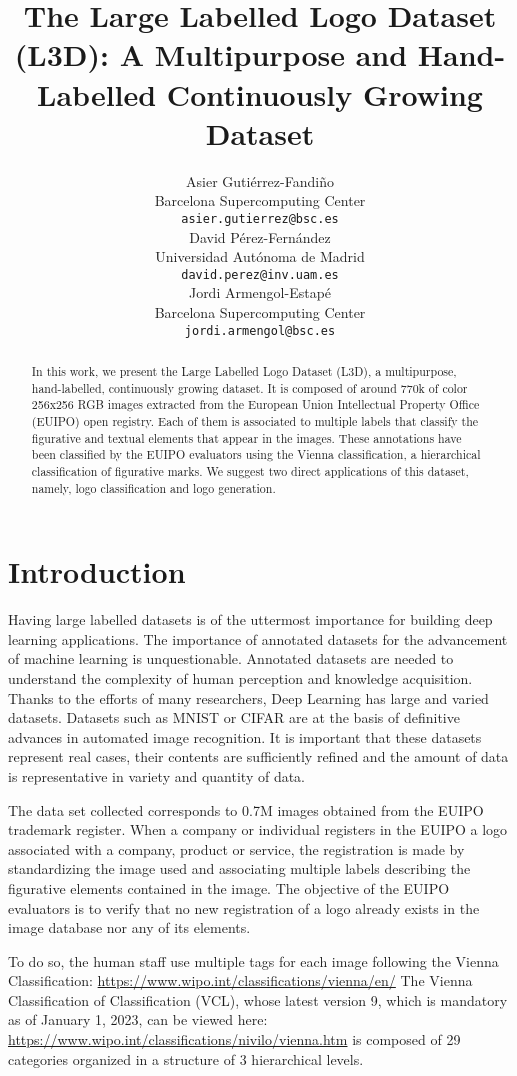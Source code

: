 \documentclass{article}
\title{The Large Labelled Logo Dataset (L3D): A Multipurpose and Hand-Labelled Continuously Growing Dataset}
\author{
 Asier Gutiérrez-Fandiño\\
  Barcelona Supercomputing Center\\
  \texttt{asier.gutierrez@bsc.es} \\
   \And
 David Pérez-Fernández\\
  Universidad Autónoma de Madrid\\
  \texttt{david.perez@inv.uam.es} \\
  \And
 Jordi Armengol-Estapé\\
  Barcelona Supercomputing Center\\
  \texttt{jordi.armengol@bsc.es} \\
}
\begin{document}
\maketitle
\begin{abstract}
In this work, we present the Large Labelled Logo Dataset (L3D), a multipurpose, hand-labelled, continuously growing dataset. It is composed of around 770k of color 256x256 RGB images extracted from the European Union Intellectual Property Office (EUIPO) open registry. Each of them is associated to multiple labels that classify the figurative and textual elements that appear in the images. These annotations have been classified by the EUIPO evaluators using the Vienna classification, a hierarchical classification of figurative marks. We suggest two direct applications of this dataset, namely, logo classification and logo generation.
\end{abstract}


\section{Introduction}

Having large labelled datasets is of the uttermost importance for building deep learning applications. The importance of annotated datasets for the advancement of machine learning is unquestionable. Annotated datasets are needed to understand the complexity of human perception and knowledge acquisition. Thanks to the efforts of many researchers, Deep Learning has large and varied datasets. Datasets such as MNIST or CIFAR are at the basis of definitive advances in automated image recognition. It is important that these datasets represent real cases, their contents are sufficiently refined and the amount of data is representative in variety and quantity of data.

The data set collected corresponds to 0.7M images obtained from the EUIPO trademark register. When a company or individual registers in the EUIPO a logo associated with a company, product or service, the registration is made by standardizing the image used and associating multiple labels describing the figurative elements contained in the image. The objective of the EUIPO evaluators is to verify that no new registration of a logo already exists in the image database nor any of its elements. 

To do so, the human staff use multiple tags for each image following the Vienna Classification:
\url{https://www.wipo.int/classifications/vienna/en/}
The Vienna Classification of Classification (VCL), whose latest version 9, which is mandatory as of January 1, 2023, can be viewed here:
\url{https://www.wipo.int/classifications/nivilo/vienna.htm}
is composed of 29 categories organized in a structure of 3 hierarchical levels.
\end{document}

